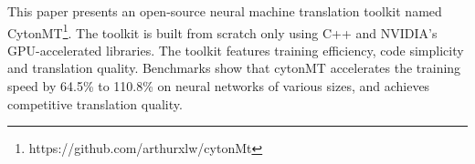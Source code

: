 This paper presents an open-source neural machine translation toolkit named CytonMT\footnote{https://github.com/arthurxlw/cytonMt}. The toolkit is built from scratch only using C++ and NVIDIA's GPU-accelerated libraries. The toolkit features training efficiency, code simplicity and translation quality. Benchmarks show that cytonMT accelerates the training speed by 64.5\% to 110.8\% on neural networks of various sizes, and achieves competitive translation quality.
